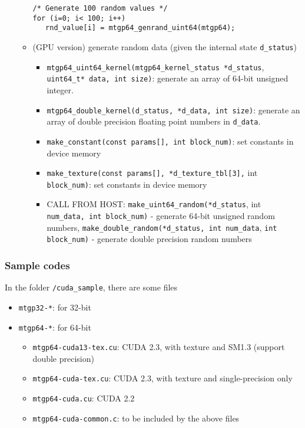 \begin{enumerate}
\begin{itemize}
\begin{lstlisting}
/* Generate 100 random values */
for (i=0; i< 100; i++) 
   rnd_value[i] = mtgp64_genrand_uint64(mtgp64);
\end{lstlisting}

\item (GPU version) generate random data (given the internal state
  \verb!d_status!)
  \begin{itemize}
  \item \verb!mtgp64_uint64_kernel(mtgp64_kernel_status *d_status!,
    \verb!uint64_t* data, int size)!: generate an array of 64-bit
    unsigned integer.
  \item \verb!mtgp64_double_kernel(d_status, *d_data, int size)!:
    generate an array of double precision floating point numbers in
    \verb!d_data!. 
  \item \verb!make_constant(const params[], int block_num)!: set
    constants in device memory
  \item \verb!make_texture(const params[], *d_texture_tbl[3],!  int
    \verb!block_num)!: set constants in device memory

  \item CALL FROM HOST: \verb!make_uint64_random(*d_status!, int
    \verb!num_data, int block_num)! - generate 64-bit unsigned random
    numbers, \verb!make_double_random(*d_status, int num_data!,
    \verb!int block_num)!  - generate double precision random numbers
  \end{itemize}
\end{itemize}
\end{enumerate}

\subsubsection{Sample codes}
\label{sec:sample-codes}

In the folder \verb!/cuda_sample!, there are some files
\begin{itemize}
\item \verb!mtgp32-*!: for 32-bit
\item \verb!mtgp64-*!: for 64-bit
  \begin{itemize}
  \item \verb!mtgp64-cuda13-tex.cu!: CUDA 2.3, with texture and SM1.3
    (support double precision)
  \item \verb!mtgp64-cuda-tex.cu!: CUDA 2.3, with texture and
    single-precision only
  \item \verb!mtgp64-cuda.cu!: CUDA 2.2
  \item \verb!mtgp64-cuda-common.c!: to be included by the above files
  \end{itemize}
\end{itemize}


